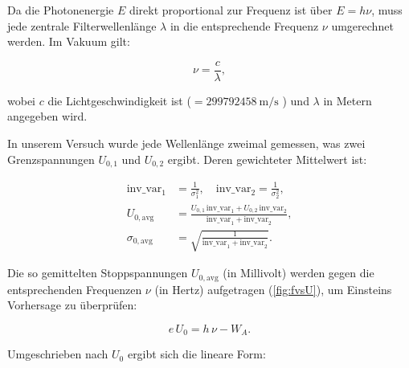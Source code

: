 Da die Photonenergie $E$ direkt proportional zur Frequenz ist über $E = h\nu$, muss jede zentrale Filterwellenlänge $\lambda$ in die entsprechende Frequenz $\nu$ umgerechnet werden. Im Vakuum gilt:

\begin{equation}
    \nu = \frac{c}{\lambda},
\end{equation}

wobei $c$ die Lichtgeschwindigkeit ist ($= \SI{299 792 458}{\metre\per\second}$ \cite{codata}) und $\lambda$ in Metern angegeben wird.

In unserem Versuch wurde jede Wellenlänge zweimal gemessen, was zwei Grenzspannungen $U_{0,1}$ und $U_{0,2}$ ergibt. Deren gewichteter Mittelwert ist:

\begin{equation}
  \begin{aligned}
    \mathrm{inv\_var}_1 &= \frac{1}{\sigma_{1}^{2}},\quad
    \mathrm{inv\_var}_2 = \frac{1}{\sigma_{2}^{2}},\\[1ex]
    U_{0,\mathrm{avg}}  &= \frac{U_{0,1}\,\mathrm{inv\_var}_1 + U_{0,2}\,\mathrm{inv\_var}_2}
                               {\mathrm{inv\_var}_1 + \mathrm{inv\_var}_2},\\[1ex]
    \sigma_{0,\mathrm{avg}} &= \sqrt{\frac{1}{\mathrm{inv\_var}_1 + \mathrm{inv\_var}_2}}.
  \end{aligned}
\end{equation}

Die so gemittelten Stoppspannungen $U_{0,\mathrm{avg}}$ (in Millivolt) werden gegen die entsprechenden Frequenzen $\nu$ (in Hertz) aufgetragen (\cref{fig:fvsU}), um Einsteins Vorhersage zu überprüfen:

\begin{equation}
  e\,U_{0} = h\,\nu - W_{A}.
\end{equation}

Umgeschrieben nach $U_{0}$ ergibt sich die lineare Form:

